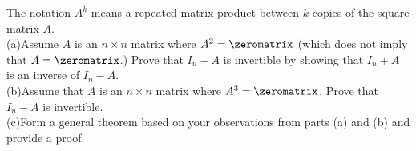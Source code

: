 The notation $A^k$ means a repeated matrix product between $k$ copies of the square matrix $A$.\\
(a)\quad Assume $A$ is an $n\times n$ matrix where $A^2=\zeromatrix$ (which does not imply that $A=\zeromatrix$.)  Prove that $I_n-A$ is invertible by showing that $I_n+A$ is an inverse of $I_n-A$.\\
(b)\quad Assume that $A$ is an $n\times n$ matrix where $A^3=\zeromatrix$.  Prove that $I_n-A$ is invertible.\\
(c)\quad Form a general theorem based on your observations from parts (a) and (b) and provide a proof.
